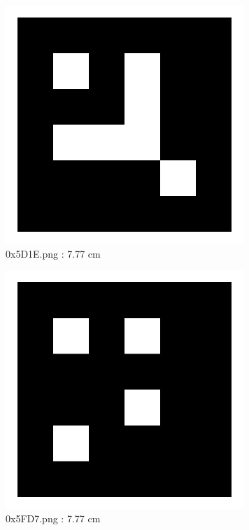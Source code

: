 \documentclass[11pt,a4,BCOR=0cm]{scrartcl}
\begin{document}
\begin{figure}
  \centering
    \includegraphics[natwidth=400,natheight=400,width=9cm]{0x5D1E.png}
    \caption{0x5D1E.png : 7.77 cm}
    \label{fig:0x5D1E.png}
  
\end{figure} 

\begin{figure}
  \centering
    \includegraphics[natwidth=400,natheight=400,width=9cm]{0x5FD7.png}
    \caption{0x5FD7.png : 7.77 cm}
    \label{fig:0x5FD7.png}
  
\end{figure} 
\end{document}
